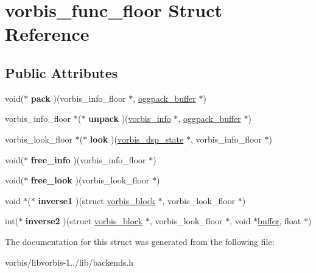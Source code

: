 \hypertarget{structvorbis__func__floor}{\section{vorbis\+\_\+func\+\_\+floor Struct Reference}
\label{structvorbis__func__floor}
}
\subsection*{Public Attributes}
\begin{DoxyCompactItemize}
\item 
\hypertarget{structvorbis__func__floor_a2d230a4997b56ea06be0b97d1baacc77}{void($\ast$ {\bfseries pack} )(vorbis\+\_\+info\+\_\+floor $\ast$, \hyperlink{structoggpack__buffer}{oggpack\+\_\+buffer} $\ast$)}\label{structvorbis__func__floor_a2d230a4997b56ea06be0b97d1baacc77}

\item 
\hypertarget{structvorbis__func__floor_a612ec582e69852b9d23ed0dbdff3bcee}{vorbis\+\_\+info\+\_\+floor $\ast$($\ast$ {\bfseries unpack} )(\hyperlink{structvorbis__info}{vorbis\+\_\+info} $\ast$, \hyperlink{structoggpack__buffer}{oggpack\+\_\+buffer} $\ast$)}\label{structvorbis__func__floor_a612ec582e69852b9d23ed0dbdff3bcee}

\item 
\hypertarget{structvorbis__func__floor_a2dd28ab707ca2a10a146650909f116db}{vorbis\+\_\+look\+\_\+floor $\ast$($\ast$ {\bfseries look} )(\hyperlink{structvorbis__dsp__state}{vorbis\+\_\+dsp\+\_\+state} $\ast$, vorbis\+\_\+info\+\_\+floor $\ast$)}\label{structvorbis__func__floor_a2dd28ab707ca2a10a146650909f116db}

\item 
\hypertarget{structvorbis__func__floor_a4c216c5c049377e832e0660711a84d5f}{void($\ast$ {\bfseries free\+\_\+info} )(vorbis\+\_\+info\+\_\+floor $\ast$)}\label{structvorbis__func__floor_a4c216c5c049377e832e0660711a84d5f}

\item 
\hypertarget{structvorbis__func__floor_a72ac78fc3f088f6df055370a8c4b5c91}{void($\ast$ {\bfseries free\+\_\+look} )(vorbis\+\_\+look\+\_\+floor $\ast$)}\label{structvorbis__func__floor_a72ac78fc3f088f6df055370a8c4b5c91}

\item 
\hypertarget{structvorbis__func__floor_a729514d8a449c295623a9d3ef59aad34}{void $\ast$($\ast$ {\bfseries inverse1} )(struct \hyperlink{structvorbis__block}{vorbis\+\_\+block} $\ast$, vorbis\+\_\+look\+\_\+floor $\ast$)}\label{structvorbis__func__floor_a729514d8a449c295623a9d3ef59aad34}

\item 
\hypertarget{structvorbis__func__floor_afa1694d4915e6d4a73ff9109a5957337}{int($\ast$ {\bfseries inverse2} )(struct \hyperlink{structvorbis__block}{vorbis\+\_\+block} $\ast$, vorbis\+\_\+look\+\_\+floor $\ast$, void $\ast$\hyperlink{structbuffer}{buffer}, float $\ast$)}\label{structvorbis__func__floor_afa1694d4915e6d4a73ff9109a5957337}

\end{DoxyCompactItemize}


The documentation for this struct was generated from the following file\+:\begin{DoxyCompactItemize}
\item 
vorbis/libvorbis-\/1../lib/backends.\+h\end{DoxyCompactItemize}
